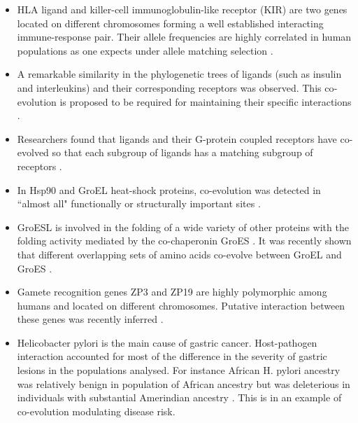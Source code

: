\begin{itemize}

\item HLA ligand and killer-cell immunoglobulin-like receptor (KIR) are two genes located on different chromosomes forming a well established interacting immune-response pair.
Their allele frequencies are highly correlated in human populations as one expects under allele matching selection \cite{single2007global}.

\item A remarkable similarity in the phylogenetic trees of ligands (such as insulin and interleukins) and their corresponding receptors was observed.
This co‐evolution is proposed to be required for maintaining their specific interactions \cite{pazos2001similarity}.

\item Researchers found that ligands and their G-protein coupled receptors have co-evolved so that each subgroup of ligands has a matching subgroup of receptors \cite{goh2000co}.

\item In Hsp90 and GroEL heat-shock proteins, co-evolution was detected in ``almost all" functionally or structurally important sites \cite{fares2006novel}.

\item GroESL is involved in the folding of a wide variety of other proteins with the folding activity mediated by the co-chaperonin GroES  \cite{ruiz2013coevolution}.
It was recently shown that different overlapping sets of amino acids co-evolve between GroEL and GroES \cite{ruiz2013coevolution}.

\item Gamete recognition genes ZP3 and ZP19 are highly polymorphic among humans and located on different chromosomes.
Putative interaction between these genes was recently inferred \cite{rohlfs2010detecting}.

\item Helicobacter pylori is the main cause of gastric cancer. 
Host-pathogen interaction accounted for most of the difference in the severity of gastric lesions in the populations analysed. 
For instance African H. pylori ancestry was relatively benign in population of African ancestry but was deleterious in individuals with substantial Amerindian ancestry \cite{kodaman2014human}.
This is in an example of co-evolution modulating disease risk.

\end{itemize}

